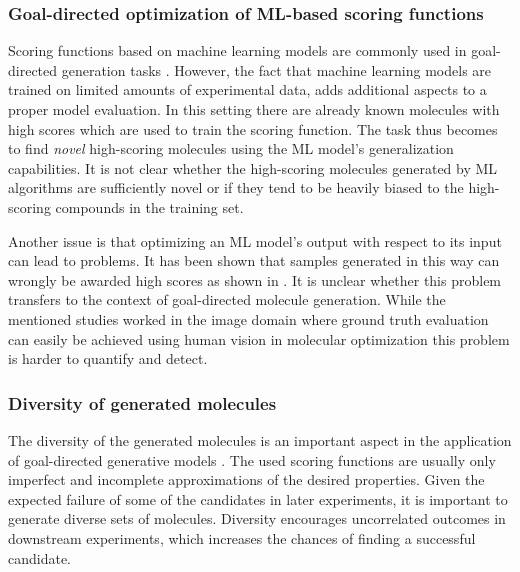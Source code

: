 \subsubsection{Goal-directed optimization of ML-based scoring functions}
Scoring functions based on machine learning models are commonly used in goal-directed generation
tasks \citep{todo}. However, the fact that machine learning models are trained on limited amounts of
experimental data, adds additional aspects to a proper model evaluation. In this setting there are
already known molecules with high scores which are  used to train the scoring function. The task
thus becomes to find \emph{novel} high-scoring molecules using the ML model's generalization
capabilities. It is not clear whether the high-scoring molecules generated by ML algorithms are
sufficiently novel or if they tend to be heavily biased to the high-scoring compounds in the
training set.

Another issue is that optimizing an ML model's output with respect to its input can lead to
problems. It has been shown that samples generated in this way can wrongly be awarded high scores as
shown in
\citep{szegedyIntriguingPropertiesNeural2014,goodfellowExplainingHarnessingAdversarial2015}.
It is unclear whether this problem transfers to the context of goal-directed molecule generation.
While the mentioned studies worked in the image domain where ground truth evaluation can easily be
achieved using human vision in molecular optimization this problem is harder to quantify and detect.


\subsubsection{Diversity of generated molecules}
The diversity of the generated molecules is an important aspect in the application of goal-directed
generative models \citep{martinDiverseViewpointsComputational2001,gorseDiversityMedicinalChemistry2006}. The used scoring functions are usually only imperfect and incomplete
approximations of the desired properties. Given the expected failure of some of the candidates in
later experiments, it is important to generate diverse sets of molecules.
Diversity encourages uncorrelated outcomes in downstream experiments, which increases
the chances of finding a successful candidate.

